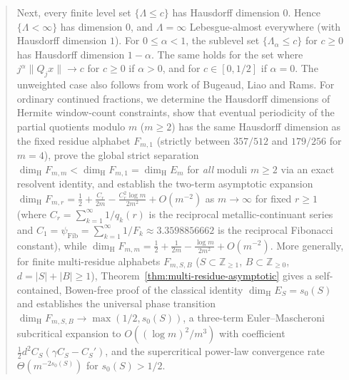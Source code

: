 \documentclass[11pt]{article}
\theoremstyle{definition}
\theoremstyle{remark}
\newcommand{\Z}{\mathbb{Z}}
\newcommand{\dimH}{\dim_{\mathrm{H}}}
\newcommand{\Lam}{\Lambda}
\begin{document}
\begin{abstract}
Next, every finite level set $\{\Lam\le c\}$ has Hausdorff dimension $0$.
Hence $\{\Lam<\infty\}$ has dimension $0$, and $\Lam=\infty$ Lebesgue-almost
everywhere (with Hausdorff dimension $1$). For $0\le\alpha<1$, the sublevel set $\{\Lam_\alpha\le c\}$ for $c\ge0$
has Hausdorff dimension $1-\alpha$. The same holds for the set where
$j^\alpha\|Q_jx\|\to c$ for $c\ge0$ if $\alpha>0$, and for
$c\in[0,1/2]$ if $\alpha=0$. The unweighted case also follows from work
of Bugeaud, Liao and Rams. For ordinary continued fractions,
we determine the Hausdorff dimensions of Hermite window-count constraints,
show that eventual periodicity of the partial quotients modulo $m$ ($m\ge2$) has
the same Hausdorff dimension as the fixed residue alphabet $F_{m,1}$ (strictly
between $357/512$ and $179/256$ for $m=4$), prove the global strict separation
$\dimH F_{m,m}<\dimH F_{m,1}=\dimH E_m$ for \emph{all} moduli $m\ge2$ via an
exact resolvent identity, and establish the two-term asymptotic expansion
$\dimH F_{m,r}=\frac12+\frac{C_r}{2m}-\frac{C_r^2\log m}{2m^2}+O(m^{-2})$ as
$m\to\infty$ for fixed $r\ge1$ (where $C_r=\sum_{k=1}^\infty 1/q_k(r)$ is the
reciprocal metallic-continuant series and $C_1=\psi_{\mathrm{Fib}}=\sum_{k=1}^\infty 1/F_k\approx3.3598856662$ is the reciprocal Fibonacci constant), while
$\dimH F_{m,m}=\frac12+\frac{1}{2m}-\frac{\log m}{2m^2}+O(m^{-2})$. More generally,
for finite multi-residue alphabets $F_{m,S,B}$ ($S\subset\Z_{\ge1}$,
$B\subset\Z_{\ge0}$, $d=|S|+|B|\ge1$), Theorem~\ref{thm:multi-residue-asymptotic}
gives a self-contained, Bowen-free proof of the classical identity
$\dimH E_S=s_0(S)$ and establishes the universal phase transition
$\dimH F_{m,S,B}\to\max(1/2,s_0(S))$, a three-term
Euler--Mascheroni subcritical expansion to $O((\log m)^2/m^3)$ with coefficient
$\frac12 d^2 C_S(\gamma C_S-C_S')$, and the supercritical power-law convergence
rate $\Theta(m^{-2s_0(S)})$ for $s_0(S)>1/2$.


\end{abstract}
\end{document}
